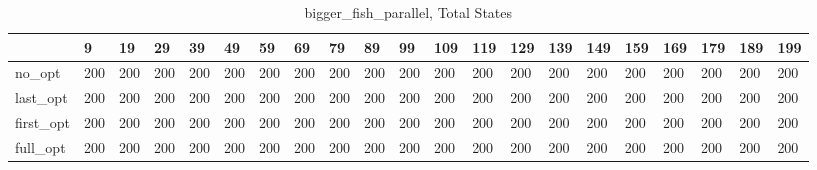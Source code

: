 \begin{table}
\caption{bigger_fish_parallel, Total States}
\label{bigger_fish_parallel_total}
\begin{tabular}{lllllllllllllllllllll}
\toprule
 & 9 & 19 & 29 & 39 & 49 & 59 & 69 & 79 & 89 & 99 & 109 & 119 & 129 & 139 & 149 & 159 & 169 & 179 & 189 & 199 \\
\midrule
no_opt & 200 & 200 & 200 & 200 & 200 & 200 & 200 & 200 & 200 & 200 & 200 & 200 & 200 & 200 & 200 & 200 & 200 & 200 & 200 & 200 \\
last_opt & 200 & 200 & 200 & 200 & 200 & 200 & 200 & 200 & 200 & 200 & 200 & 200 & 200 & 200 & 200 & 200 & 200 & 200 & 200 & 200 \\
first_opt & 200 & 200 & 200 & 200 & 200 & 200 & 200 & 200 & 200 & 200 & 200 & 200 & 200 & 200 & 200 & 200 & 200 & 200 & 200 & 200 \\
full_opt & 200 & 200 & 200 & 200 & 200 & 200 & 200 & 200 & 200 & 200 & 200 & 200 & 200 & 200 & 200 & 200 & 200 & 200 & 200 & 200 \\
\bottomrule
\end{tabular}
\end{table}
